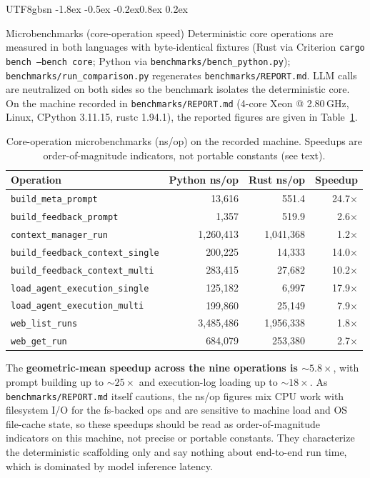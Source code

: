\documentclass{article}
\makeatletter
\renewcommand{\subsection}{\@startsection{subsection}{2}{\z@}%
  {-1.8ex \@plus -0.5ex \@minus -0.2ex}{0.8ex \@plus 0.2ex}%
  {\normalsize\bfseries\raggedright\color{accent}}}
\makeatother
\begin{document}
\begin{CJK}{UTF8}{gbsn}
\subsection{Microbenchmarks (core-operation speed)}
Deterministic core operations are measured in both languages with byte-identical
fixtures (Rust via Criterion \texttt{cargo bench --bench core}; Python via
\texttt{benchmarks/bench\_python.py}); \texttt{benchmarks/run\_comparison.py}
regenerates \texttt{benchmarks/REPORT.md}. LLM calls are neutralized on both sides so
the benchmark isolates the deterministic core. On the machine recorded in
\texttt{benchmarks/REPORT.md} (4-core Xeon @ 2.80\,GHz, Linux, CPython 3.11.15,
rustc 1.94.1), the reported figures are given in Table~\ref{tab:bench}.

\begin{table}[t]
\centering
\caption{Core-operation microbenchmarks (ns/op) on the recorded machine. Speedups
are order-of-magnitude indicators, not portable constants (see text).}
\label{tab:bench}
\begin{tabular}{lrrr}
\toprule
\textbf{Operation} & \textbf{Python ns/op} & \textbf{Rust ns/op} & \textbf{Speedup} \\
\midrule
\texttt{build\_meta\_prompt}              & 13,616    & 551.4     & 24.7$\times$ \\
\texttt{build\_feedback\_prompt}          & 1,357     & 519.9     & 2.6$\times$ \\
\texttt{context\_manager\_run}            & 1,260,413 & 1,041,368 & 1.2$\times$ \\
\texttt{build\_feedback\_context\_single} & 200,225   & 14,333    & 14.0$\times$ \\
\texttt{build\_feedback\_context\_multi}  & 283,415   & 27,682    & 10.2$\times$ \\
\texttt{load\_agent\_execution\_single}   & 125,182   & 6,997     & 17.9$\times$ \\
\texttt{load\_agent\_execution\_multi}    & 199,860   & 25,149    & 7.9$\times$ \\
\texttt{web\_list\_runs}                  & 3,485,486 & 1,956,338 & 1.8$\times$ \\
\texttt{web\_get\_run}                    & 684,079   & 253,380   & 2.7$\times$ \\
\bottomrule
\end{tabular}
\end{table}

The \textbf{geometric-mean speedup across the nine operations is ${\sim}5.8\times$},
with prompt building up to ${\sim}25\times$ and execution-log loading up to
${\sim}18\times$. As \texttt{benchmarks/REPORT.md} itself cautions, the ns/op figures
mix CPU work with filesystem I/O for the fs-backed ops and are sensitive to machine
load and OS file-cache state, so these speedups should be read as order-of-magnitude
indicators on this machine, not precise or portable constants. They characterize the
deterministic scaffolding only and say nothing about end-to-end run time, which is
dominated by model inference latency.


\end{CJK}
\end{document}
